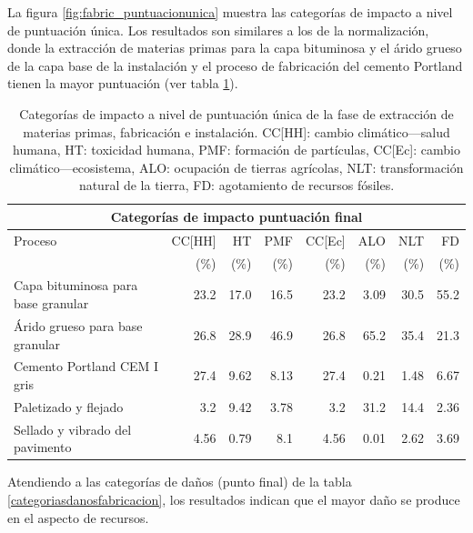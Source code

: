 La figura \ref{fig:fabric_puntuacionunica} muestra las categorías de impacto a nivel de puntuación única. Los resultados son similares a los de la normalización, donde la extracción de materias primas para la capa bituminosa y el árido grueso de la capa base de la instalación y el proceso de fabricación del cemento Portland tienen la mayor puntuación (ver tabla \ref{categoriasimpactofabricacionpuntunica}).

\begin{table}[!htb]
\centering
\begin{tabular}{p{4cm}rrrrrrr}
\toprule
\multicolumn{8}{c}{Categorías de impacto puntuación final}\\
\midrule
Proceso & CC[HH] & HT & PMF & CC[Ec] & ALO & NLT & FD\\
 &  (\%) & (\%) & (\%) & (\%) & (\%) & (\%) & (\%)\\
\midrule
Capa bituminosa para base granular & 23.2 & 17.0 & 16.5 & 23.2 & 3.09 & 30.5 & 55.2\\
Árido grueso para base granular & 26.8 & 28.9 & 46.9 & 26.8 & 65.2 & 35.4 & 21.3\\
Cemento Portland CEM I gris & 27.4 & 9.62 & 8.13 & 27.4 & 0.21 & 1.48 & 6.67\\
Paletizado y flejado & 3.2 & 9.42 & 3.78 & 3.2 & 31.2 & 14.4 & 2.36\\
Sellado y vibrado del pavimento & 4.56 & 0.79 & 8.1 & 4.56 & 0.01 & 2.62 & 3.69\\
\bottomrule
\end{tabular}
\caption[Categorías de impacto a nivel de puntuación única de la fase de extracción de materias primas, fabricación e instalación.]{Categorías de impacto a nivel de puntuación única de la fase de extracción de materias primas, fabricación e instalación. CC[HH]: cambio climático—salud humana, HT: toxicidad humana, PMF: formación de partículas, CC[Ec]: cambio climático—ecosistema, ALO: ocupación de tierras agrícolas, NLT: transformación natural de la tierra, FD: agotamiento de recursos fósiles.}
\label{categoriasimpactofabricacionpuntunica}
\end{table}

Atendiendo a las categorías de daños (punto final) de la tabla \ref{categoriasdanosfabricacion}, los resultados indican que el mayor daño se produce en el aspecto de recursos.

